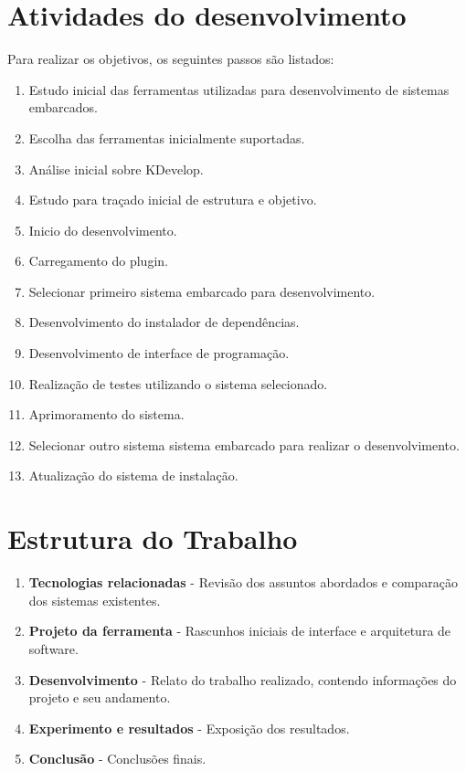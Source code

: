 \section{Atividades do desenvolvimento}
\label{ss:objetivosespecificos}
Para realizar os objetivos, os seguintes passos são listados:
\begin{enumerate}
\item Estudo inicial das ferramentas utilizadas para desenvolvimento de sistemas embarcados.
\item Escolha das ferramentas inicialmente suportadas.
\item Análise inicial sobre KDevelop.
\item Estudo para traçado inicial de estrutura e objetivo.
\item Inicio do desenvolvimento.
\item Carregamento do plugin.
\item Selecionar primeiro sistema embarcado para desenvolvimento.
\item Desenvolvimento do instalador de dependências.
\item Desenvolvimento de interface de programação.
\item Realização de testes utilizando o sistema selecionado.
\item Aprimoramento do sistema.
\item Selecionar outro sistema sistema embarcado para realizar o desenvolvimento.
\item Atualização do sistema de instalação.
\end{enumerate}

\section{Estrutura do Trabalho}

\begin{enumerate}
\item \textbf{Tecnologias relacionadas} - Revisão dos assuntos abordados e comparação dos sistemas existentes.
\item \textbf{Projeto da ferramenta} - Rascunhos iniciais de interface e arquitetura de software.
\item \textbf{Desenvolvimento} - Relato do trabalho realizado, contendo informações do projeto e seu andamento.
\item \textbf{Experimento e resultados} - Exposição dos resultados.
\item \textbf{Conclusão} - Conclusões finais.
\end{enumerate}
